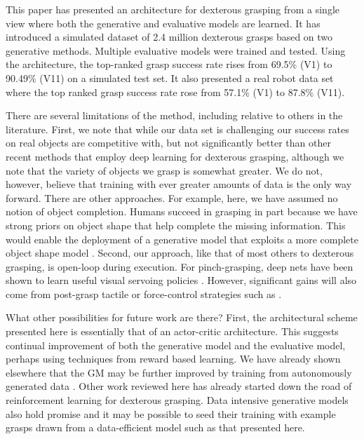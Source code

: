 This paper has presented an architecture for dexterous grasping from a single view where both the generative and evaluative models are learned. It has introduced a simulated dataset of 2.4 million dexterous grasps based on two generative methods. Multiple evaluative models were trained and tested. Using the architecture, the top-ranked grasp success rate  rises from 69.5\% (V1) to 90.49\% (V11) on a simulated test set. It also presented a real robot data set where the top ranked grasp success rate rose from 57.1\% (V1) to 87.8\% (V11).

There are several limitations of the method, including relative to others in the literature. First, we note that while our data set is challenging our success rates on real objects are competitive with, but not significantly better than other recent methods that employ deep learning for dexterous grasping, although we note that the variety of objects we grasp is somewhat greater. We do not, however, believe that training with ever greater amounts of data is the only way forward. There are other approaches. For example, here, we have assumed no notion of object completion. Humans succeed in grasping in part because we have strong priors on object shape that help complete the missing information. This would enable the deployment of a generative model that exploits a more complete object shape model \cite{kopicki2015ijrr}. Second, our approach, like that of most others to dexterous grasping, is open-loop during execution. For pinch-grasping, deep nets have been shown to learn useful visual servoing policies \cite{morrison18}. However, significant gains will also come from post-grasp tactile or force-control strategies such as \cite{Torres2018}.

What other possibilities for future work are there? First, the architectural scheme presented here is essentially that of an actor-critic architecture. This suggests continual improvement of both the generative model and the evaluative model, perhaps using techniques from reward based learning. We have already shown elsewhere that the GM may be further improved by training from autonomously generated data \cite{kopicki2019ijrr}. Other work reviewed here \cite{mandikal2021dexterous,Osa2018} has already started down the road of reinforcement learning for dexterous grasping. Data intensive generative models also hold promise \cite{veres2017modeling,Shao2020,Shang2020,Zhao2020} and it may be possible to seed their training with example grasps drawn from a data-efficient model such as that presented here.\\